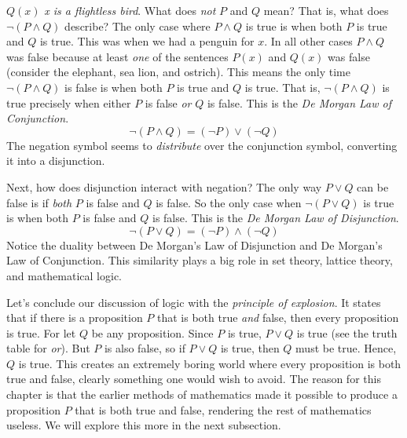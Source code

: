             $Q(x)$ \textit{x is a flightless bird}. What does
            \textit{not} $P$ and $Q$ mean? That is, what does
            $\neg(P\land{Q})$ describe? The only case where $P\land{Q}$ is true
            is when both $P$ is true and $Q$ is true. This was when we had a
            penguin for $x$. In all other cases $P\land{Q}$ was false because
            at least \textit{one} of the sentences $P(x)$ and $Q(x)$ was false
            (consider the elephant, sea lion, and ostrich). This means the only
            time $\neg(P\land{Q})$ is false is when both $P$ is true and $Q$ is
            true. That is, $\neg(P\land{Q})$ is true precisely when either $P$
            is false \textit{or} $Q$ is false. This is the
            \textit{De Morgan Law of Conjunction}.
            \begin{equation}
                \neg(P\land{Q})=(\neg{P})\lor(\neg{Q})
            \end{equation}
            The negation symbol seems to \textit{distribute} over the
            conjunction symbol, converting it into a disjunction.
            \par\hfill\par
            Next, how does disjunction interact with negation? The only way
            $P\lor{Q}$ can be false is if \textit{both} $P$ is false and $Q$ is
            false. So the only case when $\neg(P\lor{Q})$ is true is when both
            $P$ is false and $Q$ is false. This is the
            \textit{De Morgan Law of Disjunction}.
            \begin{equation}
                \neg(P\lor{Q})=(\neg{P})\land(\neg{Q})
            \end{equation}
            Notice the duality between De Morgan's Law of Disjunction and
            De Morgan's Law of Conjunction. This similarity plays a big role
            in set theory, lattice theory, and mathematical logic.
            \par\hfill\par
            Let's conclude our discussion of logic with the
            \textit{principle of explosion}. It states that if there is a
            proposition $P$ that is both true \textit{and} false, then every
            proposition is true. For let $Q$ be any proposition. Since $P$ is
            true, $P\lor{Q}$ is true (see the truth table for \textit{or}). But
            $P$ is also false, so if $P\lor{Q}$ is true, then $Q$ must be true.
            Hence, $Q$ is true. This creates an extremely boring world where
            every proposition is both true and false, clearly something one
            would wish to avoid. The reason for this chapter is that the earlier
            methods of mathematics made it possible to produce a proposition
            $P$ that is both true and false, rendering the rest of mathematics
            useless. We will explore this more in the next subsection.
